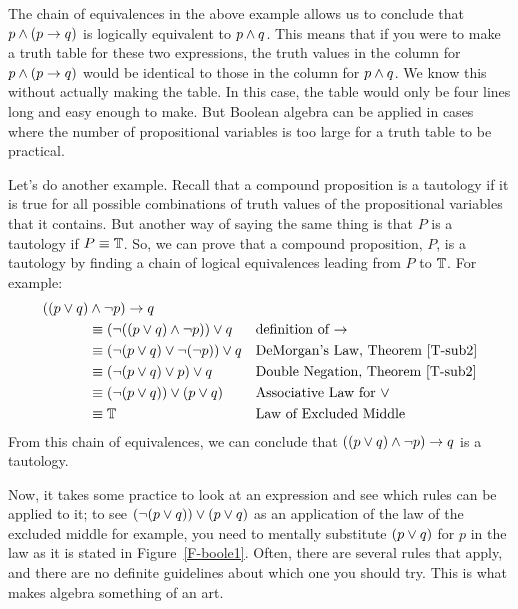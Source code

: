 The chain of equivalences in the above example allows us to conclude
that $p\wedge(p\rightarrow q)$ is logically equivalent to $p\wedge q$.
This means that if you were to make a truth table for these two
expressions, the truth values in the column for $p\wedge(p\rightarrow q)$
would be identical to those in the column for $p\wedge q$.  We know
this without actually making the table.  In this case, the table
would only be four lines long and easy enough to make.  But Boolean
algebra can be applied in cases where the number of propositional
variables is too large for a truth table to be practical. 

Let's do another example.  Recall that a compound proposition is a
tautology if it is true for all possible combinations of truth values
of the propositional variables that it contains.  But another way
of saying the same thing is that $P$ is a tautology if $P\equiv\mathbb{T}$.
So, we can prove that a compound proposition, $P$, is a tautology by
finding a chain of logical equivalences leading from $P$ to $\mathbb{T}$.
For example:
\begin{align*}
   ((p\vee q) &\wedge \lnot p)\rightarrow q &&\\
      &\equiv (\lnot((p\vee q)\wedge\lnot p))\vee q &&\text{definition of $\rightarrow$}\\
      &\equiv (\lnot(p\vee q) \vee \lnot (\lnot p))\vee q                     &&\text{DeMorgan's Law, Theorem \ref{T-sub2}}\\
      &\equiv (\lnot(p\vee q) \vee p)\vee q                                 &&\text{Double Negation, Theorem \ref{T-sub2}}\\
      &\equiv (\lnot (p\vee q)) \vee (p\vee q)                              &&\text{Associative Law for $\vee$}\\
      &\equiv \mathbb{T}                                                        &&\text{Law of Excluded Middle}\\
\end{align*}
From this chain of equivalences, we can conclude that $((p\vee q) \wedge \lnot p)\rightarrow q$
is a tautology.

Now, it takes some practice to look at an expression and see which
rules can be applied to it; to see $(\lnot (p\vee q)) \vee (p\vee q)$
as an application of the law of the excluded middle for example,
you need to mentally substitute $(p\vee q)$ for $p$ in the law as it is stated
in Figure~\ref{F-boole1}.  Often, there are several rules that
apply, and there are no definite guidelines about which one you
should try.  This is what makes algebra something of an art.


